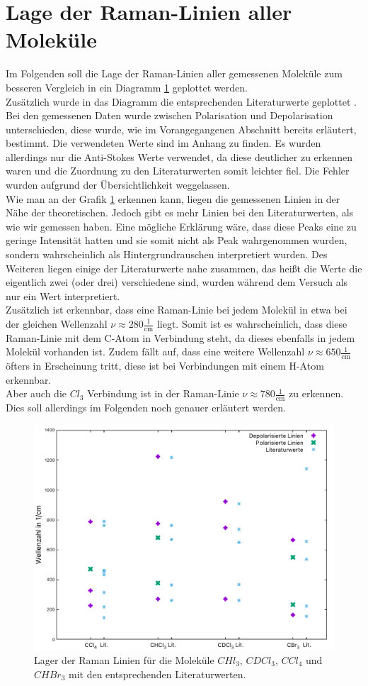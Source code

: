 \section{Lage der Raman-Linien aller Moleküle}
Im Folgenden soll die Lage der Raman-Linien aller gemessenen Moleküle zum besseren Vergleich in 
ein Diagramm \ref{fig:A5} geplottet werden.\\
Zusätzlich wurde in das Diagramm die entsprechenden Literaturwerte geplottet \citep[vgl.][]{zusatzliteratur}. \\
Bei den gemessenen Daten wurde zwischen Polarisation und Depolarisation unterschieden, diese wurde, wie 
im Vorangegangenen Abschnitt bereits erläutert, bestimmt. Die verwendeten Werte sind im Anhang zu finden. Es wurden
allerdings nur die Anti-Stokes Werte verwendet, da diese deutlicher zu erkennen waren und die Zuordnung zu 
den Literaturwerten somit leichter fiel. 
Die Fehler wurden aufgrund der Übersichtlichkeit weggelassen.\\
Wie man an der Grafik \ref{fig:A5} erkennen kann, liegen die gemessenen Linien in der Nähe der theoretischen. 
Jedoch gibt es mehr Linien bei den Literaturwerten, als wie wir gemessen haben. Eine mögliche Erklärung wäre, dass
diese Peaks eine zu geringe Intensität hatten und sie somit nicht als Peak wahrgenommen wurden, sondern wahrscheinlich 
als Hintergrundrauschen interpretiert wurden.
Des Weiteren liegen einige der Literaturwerte 
nahe zusammen, das heißt die Werte die eigentlich zwei (oder drei) verschiedene sind, wurden während dem Versuch als nur ein Wert interpretiert.\\
Zusätzlich ist erkennbar, dass eine Raman-Linie bei jedem Molekül in etwa bei der gleichen
Wellenzahl $\nu \approx 280 \frac{1}{\text{cm}}$ liegt. Somit ist es wahrscheinlich, dass diese 
Raman-Linie mit dem C-Atom in Verbindung steht, da dieses ebenfalls in jedem Molekül vorhanden ist. 
Zudem fällt auf, dass eine weitere Wellenzahl $\nu \approx 650 \frac{1}{\text{cm}}$ öfters in 
Erscheinung tritt, diese ist bei Verbindungen mit einem H-Atom erkennbar. \\
Aber auch die $Cl_3$ Verbindung ist in der Raman-Linie $\nu \approx 780 \frac{1}{\text{cm}}$ 
zu erkennen.\\
Dies soll allerdings im Folgenden noch genauer erläutert werden.
\begin{figure}
    \centering
    \includegraphics[scale=1, angle=90]{Bilder/Verbesserung_Auswertung/PlotA5.pdf}
    \caption{Lager der Raman Linien für die Moleküle $CHl_3$, $CDCl_3$, $CCl_4$ und $CHBr_3$ mit den entsprechenden Literaturwerten.}
    \label{fig:A5}
\end{figure}
